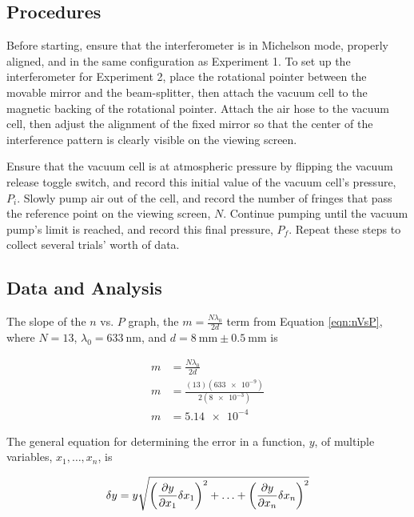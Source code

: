 \documentclass[12pt]{article}
\begin{document}
\subsection{Procedures}

\qq Before starting, ensure that the interferometer is in Michelson mode,
properly aligned, and in the same configuration as Experiment 1. To set up the
interferometer for Experiment 2, place the rotational pointer between the
movable mirror and the beam-splitter, then attach the vacuum cell to the
magnetic backing of the rotational pointer. Attach the air hose to the vacuum
cell, then adjust the alignment of the fixed mirror so that the center of the
interference pattern is clearly visible on the viewing screen. 

\qq Ensure that the vacuum cell is at atmospheric pressure by flipping the
vacuum release toggle switch, and record this initial value of the vacuum cell's
pressure, \(P_i\). Slowly pump air out of the cell, and record the number of
fringes that pass the reference point on the viewing screen, \(N\). Continue pumping
until the vacuum pump's limit is reached, and record this final pressure,
\(P_f\). Repeat these steps to collect several trials' worth of data.

\subsection{Data and Analysis}

\qq The slope of the \(n\) vs. \(P\) graph, the \(m = \frac{N \lambda_0}{2 d}\) term
from Equation \ref{eqn:nVsP}, where \(N = 13\), \(\lambda_0 =
\SI{633}{\nano\meter}\), and \(d = \SI{8}{\milli\meter} \pm \SI{0.5}{\milli\meter}\) is

\begin{align*}
  m &= \frac{N \lambda_0}{2 d} \\
  m &= \frac{(13) (\num{633e-9})}{2 (\num{8e-3})} \\
  m &= \num{5.14e-4}
\end{align*}

\qq The general equation for determining the error in a function, \(y\), of
multiple variables, \(x_1, \ldots, x_n\), is

\begin{equation}
  \label{eqn:genErrProp}
  \delta y = y \sqrt{\left(\frac{\partial y}{\partial x_1} \delta x_1 \right)^2
    + \ldots + \left(\frac{\partial y}{\partial x_n} \delta x_n \right)^2} \\
\end{equation}
\end{document}
